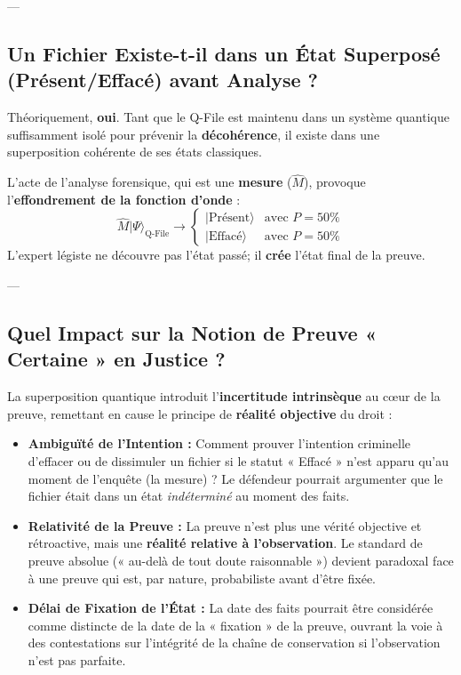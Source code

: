 \documentclass[12pt,a4paper]{report}
\begin{document}
---

\subsection*{Un Fichier Existe-t-il dans un État Superposé (Présent/Effacé) avant Analyse ?}

Théoriquement, \textbf{oui}. Tant que le Q-File est maintenu dans un système quantique suffisamment isolé pour prévenir la \textbf{décohérence}, il existe dans une superposition cohérente de ses états classiques.

L'acte de l'analyse forensique, qui est une \textbf{mesure} ($\hat{M}$), provoque l'\textbf{effondrement de la fonction d'onde} :
$$\hat{M} |\Psi\rangle_{\text{Q-File}} \longrightarrow \begin{cases} |\text{Présent}\rangle & \text{avec } P = 50\% \\ |\text{Effacé}\rangle & \text{avec } P = 50\% \end{cases}$$
L'expert légiste ne découvre pas l'état passé; il \textbf{crée} l'état final de la preuve.

---

\subsection*{Quel Impact sur la Notion de Preuve « Certaine » en Justice ?}

La superposition quantique introduit l'\textbf{incertitude intrinsèque} au cœur de la preuve, remettant en cause le principe de \textbf{réalité objective} du droit :

\begin{itemize}
	\item \textbf{Ambiguïté de l'Intention :} Comment prouver l'intention criminelle d'effacer ou de dissimuler un fichier si le statut « Effacé » n'est apparu qu'au moment de l'enquête (la mesure) ? Le défendeur pourrait argumenter que le fichier était dans un état \emph{indéterminé} au moment des faits.
	\item \textbf{Relativité de la Preuve :} La preuve n'est plus une vérité objective et rétroactive, mais une \textbf{réalité relative à l'observation}. Le standard de preuve absolue (« au-delà de tout doute raisonnable ») devient paradoxal face à une preuve qui est, par nature, probabiliste avant d'être fixée.
	\item \textbf{Délai de Fixation de l'État :} La date des faits pourrait être considérée comme distincte de la date de la « fixation » de la preuve, ouvrant la voie à des contestations sur l'intégrité de la chaîne de conservation si l'observation n'est pas parfaite.
\end{itemize}
\end{document}
